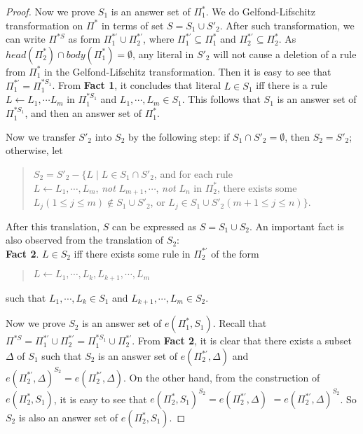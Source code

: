 \documentclass{tlp}
\begin{document}
\begin{proof}
Now we prove $S_{1}$ is an answer set of $\Pi_{1}^{*}$.
We do Gelfond-Lifschitz transformation on $\Pi^{*}$ in terms of
set $S=S_{1}\cup S'_{2}$. After such transformation,
we can write $\Pi^{* S}$ as form
$\Pi_{1}^{*'}\cup\Pi_{2}^{*'}$, where
$\Pi_{1}^{*'}\subseteq \Pi_{1}^{*}$ and $\Pi_{2}^{*'}\subseteq \Pi_{2}^{*}$.
As $head(\Pi_{2}^{*}) \cap body(\Pi_{1}^{*})=\emptyset$,
any literal
in $S'_{2}$ will not cause a deletion of a rule from $\Pi_{1}^{*}$ in
the Gelfond-Lifschitz transformation.
Then it is easy to see that $\Pi_{1}^{*'} =\Pi_{1}^{* S_{1}}$.
From {\bf Fact 1}, it concludes that
literal $L\in S_{1}$ iff there is a rule
$L\leftarrow L_{1},\cdots L_{m}$ in $\Pi_{1}^{* S_{1}}$ and
$L_{1},\cdots,L_{m} \in S_{1}$. This follows that
$S_{1}$ is an answer set of $\Pi_{1}^{* S_{1}}$, and then
an answer set of $\Pi_{1}^{*}$.

Now we transfer $S'_{2}$ into $S_2$ by the following step:
if $S_{1}\cap S'_{2}=\emptyset$, then
$S_2=S'_{2}$; otherwise, let
\begin{quote}
$S_2=S'_{2}-\{L\mid L\in S_{1}\cap S'_{2}$,
and for each rule \\
\hspace*{.9in} $L\leftarrow L_{1},\cdots,L_{m}$,
{\em not} $L_{m+1},\cdots$, {\em not} $L_{n}$ in $\Pi_{2}^{*}$, there exists
some \\
\hspace*{.9in} $L_{j} (1\leq j\leq m) \not\in S_{1}\cup S'_{2}$, or
$L_{j}\in S_{1}\cup S'_{2} (m+1\leq j\leq n)\}$.
\end{quote}
After this translation, $S$ can be expressed as
$S=S_{1}\cup S_2$.
An important fact is also observed from the translation of $S_{2}$:\\
{\bf Fact 2}. $L\in S_2$ iff
there exists some rule in $\Pi_{2}^{*'}$ of the form
\begin{quote}
$L\leftarrow L_{1},\cdots,L_{k},L_{k+1},\cdots,L_{m}$
\end{quote}
such that $L_{1},\cdots,L_{k}\in S_{1}$ and
$L_{k+1},\cdots,L_{m}\in S_2$.

Now we prove $S_2$ is an answer set of $e(\Pi_{1}^{*}, S_{1})$.
Recall that
$\Pi^{* S}=\Pi_{1}^{*'}\cup \Pi_{2}^{*'}=\Pi_{1}^{* S_{1}}\cup \Pi_{2}^{*'}$.
From {\bf Fact 2}, it is clear that there exists a subset $\Delta$ of
$S_{1}$ such that $S_2$ is an answer set of
$e(\Pi_{2}^{*'},\Delta)$ and $e(\Pi_{2}^{*'},\Delta)^{S_2}=e(\Pi_{2}^{*'},\Delta)$.
On the other hand, from the construction
of $e(\Pi_{2}^{*},S_{1})$, it is easy to see that
$e(\Pi_{2}^{*},S_{1})^{S_2}=e(\Pi_{2}^{*'},\Delta)$
$=e(\Pi_{2}^{*'},\Delta)^{S_2}$. So $S_2$ is also an answer set
of $e(\Pi_{2}^{*},S_{1})$.


\end{proof}
\end{document}
